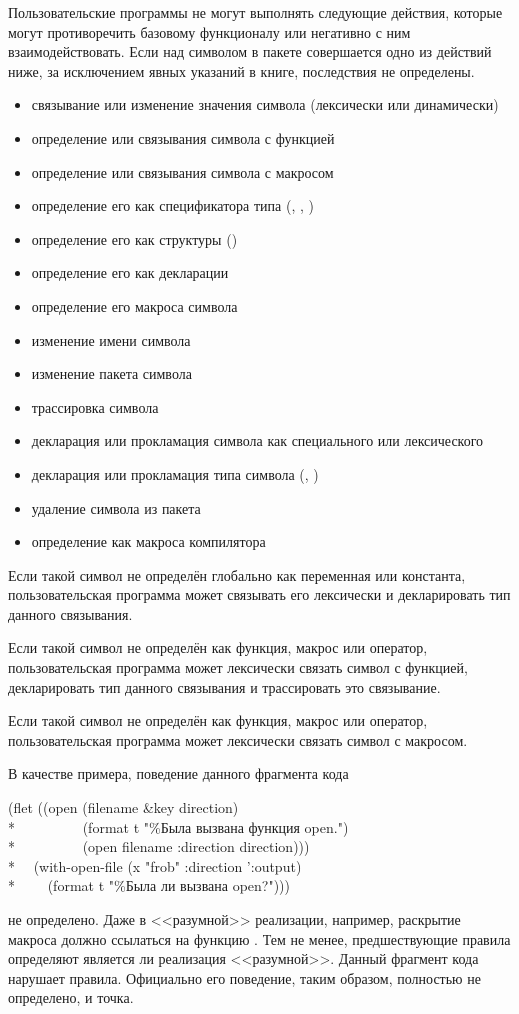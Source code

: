 Пользовательские программы не могут выполнять следующие действия, которые
могут противоречить базовому функционалу или негативно с ним взаимодействовать.
Если над символом в пакете  совершается одно из действий ниже,
за исключением явных указаний в книге, последствия не определены.
\begin{itemize}
\item связывание или изменение значения символа (лексически или динамически)
\item определение или связывания символа с функцией
\item определение или связывания символа с макросом
\item определение его как спецификатора типа (, , )
\item определение его как структуры ()
\item определение его как декларации
\item определение его макроса символа
\item изменение имени символа
\item изменение пакета символа
\item трассировка символа
\item декларация или прокламация символа как специального или лексического
\item декларация или прокламация типа символа (, )
\item удаление символа из пакета 
\item определение как макроса компилятора
\end{itemize}

Если такой символ не определён глобально как переменная или константа,
пользовательская программа может связывать его лексически и декларировать тип
 данного связывания.

Если такой символ не определён как функция, макрос или оператор,
пользовательская программа может лексически связать символ с функцией,
декларировать тип  данного связывания и трассировать это связывание. 

Если такой символ не определён как функция, макрос или оператор,
пользовательская программа может лексически связать символ с макросом.

В качестве примера, поведение данного фрагмента кода
\begin{lisp}
(flet ((open (filename \&key direction) \\*
~~~~~~~~~(format t "{\Xtilde}\%Была вызвана функция open.")  \\*
~~~~~~~~~(open filename :direction direction))) \\*
~~(with-open-file (x "frob" :direction ':output)  \\*
~~~~(format t "{\Xtilde}\%Была ли вызвана open?")))
\end{lisp}
не определено. Даже в <<разумной>> реализации, например, раскрытие макроса
 должно ссылаться на функцию . Тем не менее,
предшествующие правила определяют является ли реализация <<разумной>>.
Данный фрагмент кода нарушает правила. Официально его поведение, таким образом,
полностью не определено, и точка.

